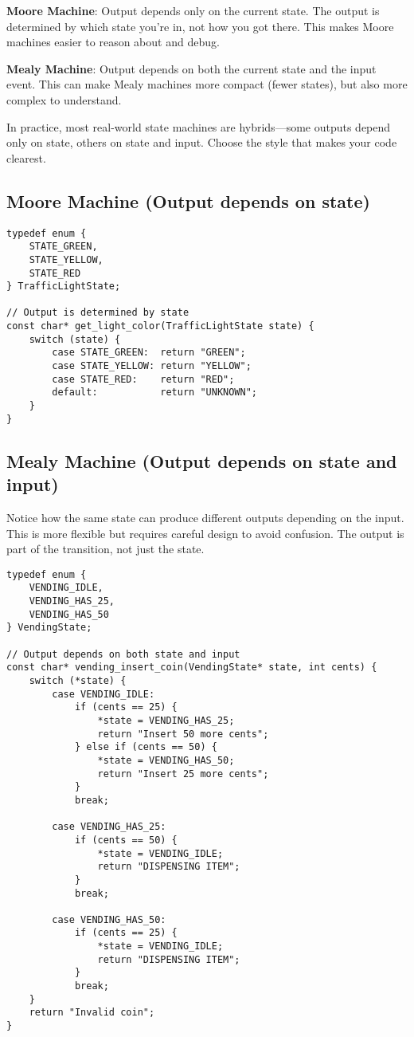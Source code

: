 \textbf{Moore Machine}: Output depends only on the current state. The output is determined by which state you're in, not how you got there. This makes Moore machines easier to reason about and debug.

\textbf{Mealy Machine}: Output depends on both the current state and the input event. This can make Mealy machines more compact (fewer states), but also more complex to understand.

In practice, most real-world state machines are hybrids—some outputs depend only on state, others on state and input. Choose the style that makes your code clearest.

\subsection{Moore Machine (Output depends on state)}

\begin{lstlisting}
typedef enum {
    STATE_GREEN,
    STATE_YELLOW,
    STATE_RED
} TrafficLightState;

// Output is determined by state
const char* get_light_color(TrafficLightState state) {
    switch (state) {
        case STATE_GREEN:  return "GREEN";
        case STATE_YELLOW: return "YELLOW";
        case STATE_RED:    return "RED";
        default:           return "UNKNOWN";
    }
}
\end{lstlisting}

\subsection{Mealy Machine (Output depends on state and input)}

Notice how the same state can produce different outputs depending on the input. This is more flexible but requires careful design to avoid confusion. The output is part of the transition, not just the state.

\begin{lstlisting}
typedef enum {
    VENDING_IDLE,
    VENDING_HAS_25,
    VENDING_HAS_50
} VendingState;

// Output depends on both state and input
const char* vending_insert_coin(VendingState* state, int cents) {
    switch (*state) {
        case VENDING_IDLE:
            if (cents == 25) {
                *state = VENDING_HAS_25;
                return "Insert 50 more cents";
            } else if (cents == 50) {
                *state = VENDING_HAS_50;
                return "Insert 25 more cents";
            }
            break;

        case VENDING_HAS_25:
            if (cents == 50) {
                *state = VENDING_IDLE;
                return "DISPENSING ITEM";
            }
            break;

        case VENDING_HAS_50:
            if (cents == 25) {
                *state = VENDING_IDLE;
                return "DISPENSING ITEM";
            }
            break;
    }
    return "Invalid coin";
}
\end{lstlisting}

